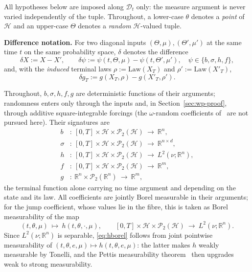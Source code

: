\documentclass[preprint,12pt]{elsarticle}
\newcommand{\R}{\mathbb{R}}
\newcommand{\Law}{\mathrm{Law}}
\numberwithin{equation}{section}
\theoremstyle{plain}
\theoremstyle{definition}
\theoremstyle{\PaperRemarkStyle}
\begin{document}
\noindent All hypotheses below are imposed along $\mathcal D_t$ only: the measure argument is
never varied independently of the tuple. Throughout, a lower-case $\theta$ denotes a \emph{point} of
$\mathcal H$ and an upper-case $\Theta$ denotes a \emph{random} $\mathcal H$-valued tuple.

\smallskip\noindent\textbf{Difference notation.}
For two diagonal inputs $(\Theta,\mu),(\Theta',\mu')$ at the same time $t$ on the same
probability space, $\delta$ denotes the difference
\[
\delta X:=X-X',\qquad
\delta\psi:=\psi(t,\Theta,\mu)-\psi(t,\Theta',\mu'),\quad\psi\in\{b,\sigma,h,f\},
\]
and, with the \emph{induced} terminal laws $\rho:=\Law(X_T)$ and
$\rho':=\Law(X'_T)$,
\[
\delta g_T:=g(X_T,\rho)-g(X'_T,\rho') .
\]

Throughout, $b,\sigma,h,f,g$ are deterministic functions of their arguments; randomness
enters only through the inputs and, in Section~\ref{sec:wp-proof}, through additive
square-integrable forcings (the $\omega$-random coefficients of~\cite{ChenNie,LiMin} are
not pursued here). Their signatures are
\[
\begin{aligned}
b&\colon\ [0,T]\times\mathcal H\times\mathcal P_2(\mathcal H)\ \to\ \R^n,\\
\sigma&\colon\ [0,T]\times\mathcal H\times\mathcal P_2(\mathcal H)\ \to\ \R^{n\times d},\\
h&\colon\ [0,T]\times\mathcal H\times\mathcal P_2(\mathcal H)\ \to\ L^2(\nu;\R^n),\\
f&\colon\ [0,T]\times\mathcal H\times\mathcal P_2(\mathcal H)\ \to\ \R^m,\\
g&\colon\ \R^n\times\mathcal P_2(\R^n)\ \to\ \R^m,
\end{aligned}
\]
the terminal function alone carrying no time argument and depending on the state and its
law. All coefficients are jointly Borel measurable in their arguments; for the jump
coefficient, whose values lie in the fibre, this is taken as Borel measurability of the map
\begin{equation}\label{eq:hborel}
(t,\theta,\mu)\ \longmapsto\ h(t,\theta,\cdot,\mu),
\qquad
[0,T]\times\mathcal H\times\mathcal P_2(\mathcal H)\ \longrightarrow\ L^2(\nu;\R^n).
\end{equation}
Since $L^2(\nu;\R^n)$ is separable, \eqref{eq:hborel} follows from joint pointwise
measurability of $(t,\theta,e,\mu)\mapsto h(t,\theta,e,\mu)$: the latter makes $h$ weakly
measurable by Tonelli, and the Pettis measurability
theorem~\cite[Theorem~1.1.6]{HNVW} then upgrades weak to strong measurability.
\end{document}
